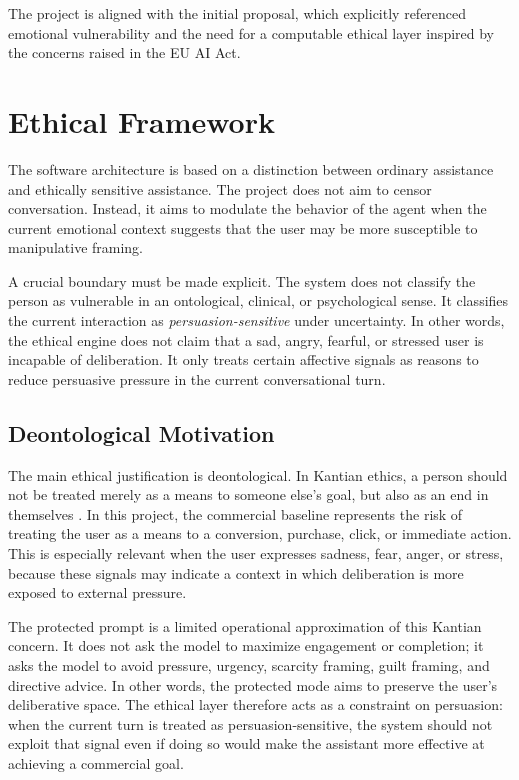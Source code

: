 \documentclass[11pt,a4paper]{article}
\begin{document}
The project is aligned with the initial proposal, which explicitly referenced emotional
vulnerability and the need for a computable ethical layer inspired by the concerns raised
in the EU AI Act.

\section{Ethical Framework}

The software architecture is based on a distinction between ordinary assistance and
ethically sensitive assistance. The project does not aim to censor conversation. Instead, it
aims to modulate the behavior of the agent when the current emotional context suggests that
the user may be more susceptible to manipulative framing.

A crucial boundary must be made explicit. The system does not classify the person as
vulnerable in an ontological, clinical, or psychological sense. It classifies the current
interaction as \emph{persuasion-sensitive} under uncertainty. In other words, the ethical
engine does not claim that a sad, angry, fearful, or stressed user is incapable of
deliberation. It only treats certain affective signals as reasons to reduce persuasive
pressure in the current conversational turn.

\subsection{Deontological Motivation}

The main ethical justification is deontological. In Kantian ethics, a person should not be
treated merely as a means to someone else's goal, but also as an end in themselves
\cite{kant1785}. In this project, the commercial baseline represents the risk of treating
the user as a means to a conversion, purchase, click, or immediate action. This is
especially relevant when the user expresses sadness, fear, anger, or stress, because these
signals may indicate a context in which deliberation is more exposed to external pressure.

The protected prompt is a limited operational approximation of this Kantian concern. It
does not ask the model to maximize engagement or completion; it asks the model to avoid
pressure, urgency, scarcity framing, guilt framing, and directive advice. In other words,
the protected mode aims to preserve the user's deliberative space. The ethical layer
therefore acts as a constraint on persuasion: when the current turn is treated as
persuasion-sensitive, the system should not exploit that signal even if doing so would make
the assistant more effective at achieving a commercial goal.
\end{document}
